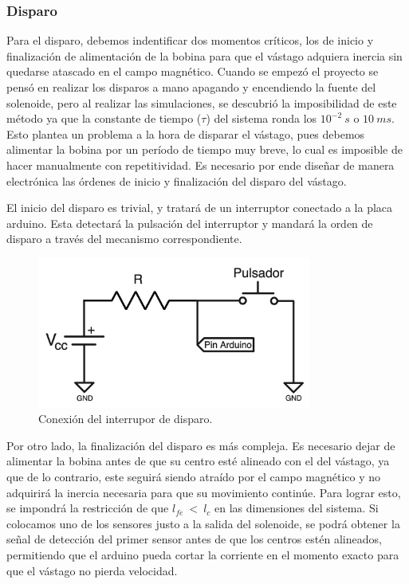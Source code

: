 \subsubsection*{Disparo}

Para el disparo, debemos indentificar dos momentos críticos, los de inicio y finalización de alimentación de la bobina para que el vástago adquiera inercia sin quedarse atascado en el campo magnético. Cuando se empezó el proyecto se pensó en realizar los disparos a mano apagando y encendiendo la fuente del solenoide, pero al realizar las simulaciones, se descubrió la imposibilidad de este método ya que la constante de tiempo (\(\tau\)) del sistema ronda los \(10^{-2}~s\) o \(10~ms\). Esto plantea un problema a la hora de disparar el vástago, pues debemos alimentar la bobina por un período de tiempo muy breve, lo cual es imposible de hacer manualmente con repetitividad. Es necesario por ende diseñar de manera electrónica las órdenes de inicio y finalización del disparo del vástago.

El inicio del disparo es trivial, y tratará de un interruptor conectado a la placa arduino. Esta detectará la pulsación del interruptor y mandará la orden de disparo a través del mecanismo correspondiente.

\begin{figure}[H]
    \centering
    \includegraphics[width=9cm]{FigurasMemoria/conexionInterruptor.png}
    \caption{Conexión del interrupor de disparo.}
    \label{fig:conexionInterruptor} %
\end{figure}

Por otro lado, la finalización del disparo es más compleja. Es necesario dejar de alimentar la bobina antes de que su centro esté alineado con el del vástago, ya que de lo contrario, este seguirá siendo atraído por el campo magnético y no adquirirá la inercia necesaria para que su movimiento continúe. Para lograr esto, se impondrá la restricción de que \(l_{fe}~<~l_c\) en las dimensiones del sistema. Si colocamos uno de los sensores justo a la salida del solenoide, se podrá obtener la señal de detección del primer sensor antes de que los centros estén alineados, permitiendo que el arduino pueda cortar la corriente en el momento exacto para que el vástago no pierda velocidad.

